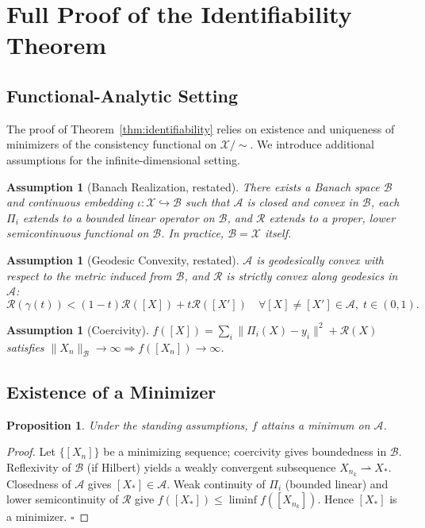 \documentclass[11pt, oneside]{article}
\newtheorem{proposition}[theorem]{Proposition}
\newtheorem{assumption}[theorem]{Assumption}
\newcommand{\Xmod}{\mathcal{X}/{\sim}}
\begin{document}
\section{Full Proof of the Identifiability Theorem}
\label{app:identifiability}

\subsection{Functional-Analytic Setting}

The proof of Theorem~\ref{thm:identifiability} relies on existence and uniqueness of
minimizers of the consistency functional on $\Xmod$. We introduce additional assumptions
for the infinite-dimensional setting.

\begin{assumption}[Banach Realization, restated]
There exists a Banach space $\mathcal{B}$ and continuous embedding
$\iota : \mathcal{X} \hookrightarrow \mathcal{B}$ such that $\mathcal{A}$ is closed and
convex in $\mathcal{B}$, each $\Pi_i$ extends to a bounded linear operator on $\mathcal{B}$,
and $\mathcal{R}$ extends to a proper, lower semicontinuous functional on $\mathcal{B}$.
In practice, $\mathcal{B} = \mathcal{X}$ itself.
\end{assumption}

\begin{assumption}[Geodesic Convexity, restated]
$\mathcal{A}$ is geodesically convex with respect to the metric induced from $\mathcal{B}$,
and $\mathcal{R}$ is strictly convex along geodesics in $\mathcal{A}$:
\[
\mathcal{R}(\gamma(t)) < (1-t)\mathcal{R}([X]) + t\mathcal{R}([X'])
\quad \forall [X] \ne [X'] \in \mathcal{A},\; t \in (0,1).
\]
\end{assumption}

\begin{assumption}[Coercivity]
$f([X]) = \sum_i \|\Pi_i(X)-y_i\|^2 + \mathcal{R}(X)$ satisfies
$\|X_n\|_{\mathcal{B}} \to \infty \Rightarrow f([X_n]) \to \infty$.
\end{assumption}

\subsection{Existence of a Minimizer}

\begin{proposition}
Under the standing assumptions, $f$ attains a minimum on $\mathcal{A}$.
\end{proposition}
\begin{proof}
Let $\{[X_n]\}$ be a minimizing sequence; coercivity gives boundedness in $\mathcal{B}$.
Reflexivity of $\mathcal{B}$ (if Hilbert) yields a weakly convergent subsequence
$X_{n_k} \rightharpoonup X_*$. Closedness of $\mathcal{A}$ gives $[X_*] \in \mathcal{A}$.
Weak continuity of $\Pi_i$ (bounded linear) and lower semicontinuity of $\mathcal{R}$
give $f([X_*]) \le \liminf f([X_{n_k}])$. Hence $[X_*]$ is a minimizer. $\square$
\end{proof}
\end{document}
